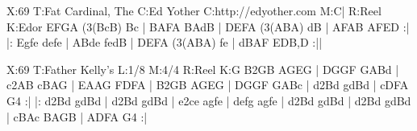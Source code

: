 \documentclass{article}
\begin{document}
\begin{abc}[name]
X:69
T:Fat Cardinal, The
C:Ed Yother
C:http://edyother.com
M:C|
R:Reel
K:Edor
EFGA (3(BcB) Bc | BAFA BAdB | DEFA (3(ABA) dB | AFAB AFED :|
|: Egfe defe | ABde fedB | DEFA (3(ABA) fe | dBAF EDB,D :||
\end{abc}

\begin{abc}[name]
X:69
T:Father Kelly's
L:1/8
M:4/4
R:Reel
K:G
B2GB AGEG | DGGF GABd | c2AB cBAG | EAAG FDFA |
B2GB AGEG | DGGF GABc | d2Bd gdBd | cDFA G4 :|
|: d2Bd gdBd | d2Bd gdBd | e2ce agfe | defg agfe |
d2Bd gdBd | d2Bd gdBd | cBAc BAGB | ADFA G4 :|
\end{abc}
\end{document}
